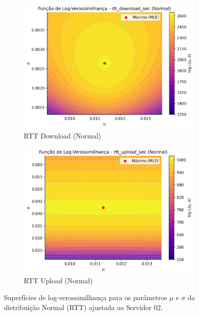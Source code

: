 \documentclass{article}
\begin{document}
\begin{figure}[htp]
	\centering
	\begin{subfigure}[b]{0.48\textwidth} %
		\includegraphics[width=\textwidth]{../figures/mle/rtt_download_sec_loglik_surface_normal_server02.png}
		\caption{RTT Download (Normal)}
		\label{fig:rtt_download_sec_loglik_surface_normal_server02}
	\end{subfigure}
	\hfill %
	\begin{subfigure}[b]{0.48\textwidth} %
		\includegraphics[width=\textwidth]{../figures/mle/rtt_upload_sec_loglik_surface_normal_server02.png}
		\caption{RTT Upload (Normal)}
		\label{fig:rtt_upload_sec_loglik_surface_normal_server02}
	\end{subfigure}
	\caption{Superfícies de log-verossimilhança para os parâmetros $\mu$ e $\sigma$ da distribuição Normal (RTT) ajustada ao Servidor 02.}
	\label{fig:rtt_loglik_normal_combined_server02}
\end{figure}
\end{document}

